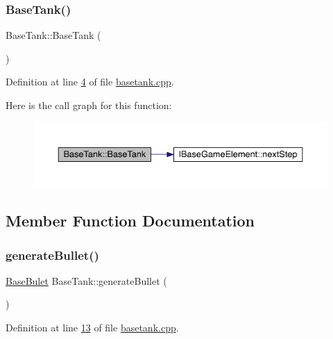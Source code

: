 \subsubsection{\texorpdfstring{Base\+Tank()}{BaseTank()}}
{\footnotesize\ttfamily Base\+Tank\+::\+Base\+Tank (\begin{DoxyParamCaption}{ }\end{DoxyParamCaption})}



Definition at line \hyperlink{a00038_source_l00004}{4} of file \hyperlink{a00038_source}{basetank.\+cpp}.

Here is the call graph for this function\+:
\nopagebreak
\begin{figure}[H]
\begin{center}
\leavevmode
\includegraphics[width=350pt]{d1/db7/a00157_ab09f29abaec12417480cae3a5f900a41_cgraph}
\end{center}
\end{figure}


\subsection{Member Function Documentation}
\mbox{\label{a00157_a901c01a2908f900b4cd45e791d27b0d3}} 
\subsubsection{\texorpdfstring{generate\+Bullet()}{generateBullet()}}
{\footnotesize\ttfamily \hyperlink{a00153}{Base\+Bulet} Base\+Tank\+::generate\+Bullet (\begin{DoxyParamCaption}{ }\end{DoxyParamCaption})\hspace{0.3cm}{\ttfamily [virtual]}}



Definition at line \hyperlink{a00038_source_l00013}{13} of file \hyperlink{a00038_source}{basetank.\+cpp}.

\mbox{\label{a00157_aeecdd72e10d3996ee6c72c59f8bf69d8}} 
